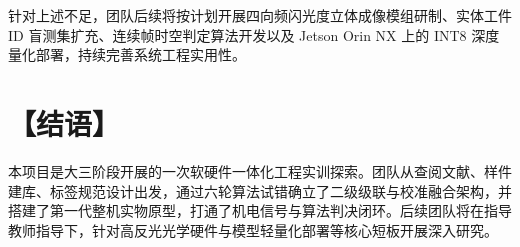 针对上述不足，团队后续将按计划开展四向频闪光度立体成像模组研制、实体工件 ID 盲测集扩充、连续帧时空判定算法开发以及 Jetson Orin NX 上的 INT8 深度量化部署，持续完善系统工程实用性。

\section*{【结语】}

本项目是大三阶段开展的一次软硬件一体化工程实训探索。团队从查阅文献、样件建库、标签规范设计出发，通过六轮算法试错确立了二级级联与校准融合架构，并搭建了第一代整机实物原型，打通了机电信号与算法判决闭环。后续团队将在指导教师指导下，针对高反光光学硬件与模型轻量化部署等核心短板开展深入研究。
